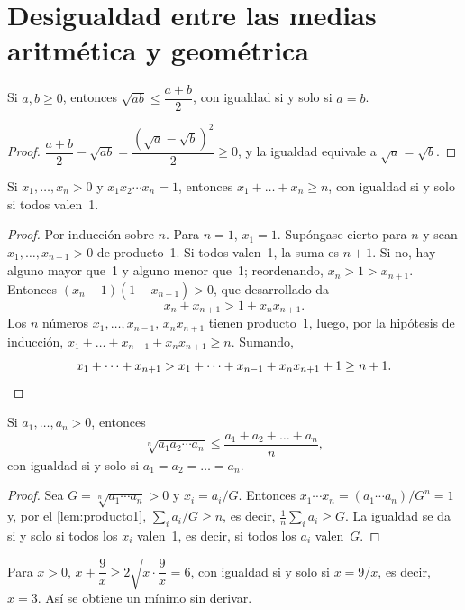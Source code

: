 \section{Desigualdad entre las medias aritmética y geométrica}

\begin{proposicion}\label{prop:amgm2}
Si $a,b\ge0$, entonces $\sqrt{ab}\le\dfrac{a+b}{2}$, con igualdad si y solo si $a=b$.
\end{proposicion}

\begin{proof}
$\dfrac{a+b}{2}-\sqrt{ab}=\dfrac{(\sqrt a-\sqrt b)^2}{2}\ge0$, y la igualdad equivale a $\sqrt a=\sqrt b$.
\end{proof}

\begin{lema}\label{lem:producto1}
Si $x_1,\dots,x_n>0$ y $x_1x_2\cdots x_n=1$, entonces $x_1+\dots+x_n\ge n$, con igualdad si y solo si todos valen~1.
\end{lema}

\begin{proof}
Por inducción sobre $n$. Para $n=1$, $x_1=1$. Supóngase cierto para $n$ y sean $x_1,\dots,x_{n+1}>0$ de producto~1. Si todos valen~1, la suma es $n+1$. Si no, hay alguno mayor que~1 y alguno menor que~1; reordenando, $x_n>1>x_{n+1}$. Entonces $(x_n-1)(1-x_{n+1})>0$, que desarrollado da
\[
x_n+x_{n+1}>1+x_nx_{n+1}.
\]
Los $n$ números $x_1,\dots,x_{n-1},\,x_nx_{n+1}$ tienen producto~1, luego, por la hipótesis de inducción, $x_1+\dots+x_{n-1}+x_nx_{n+1}\ge n$. Sumando,
\[
x_1+\dots+x_{n+1}>x_1+\dots+x_{n-1}+x_nx_{n+1}+1\ge n+1.\qedhere
\]
\end{proof}

\begin{teorema}\label{teo:amgm}
Si $a_1,\dots,a_n>0$, entonces
\[
\sqrt[n]{a_1a_2\cdots a_n}\le\frac{a_1+a_2+\dots+a_n}{n},
\]
con igualdad si y solo si $a_1=a_2=\dots=a_n$.
\end{teorema}

\begin{proof}
Sea $G=\sqrt[n]{a_1\cdots a_n}>0$ y $x_i=a_i/G$. Entonces $x_1\cdots x_n=(a_1\cdots a_n)/G^n=1$ y, por el \cref{lem:producto1}, $\sum_i a_i/G\ge n$, es decir, $\frac1n\sum_ia_i\ge G$. La igualdad se da si y solo si todos los $x_i$ valen~1, es decir, si todos los $a_i$ valen~$G$.
\end{proof}

\begin{ejemplo}\label{ej:amgm-optim}
Para $x>0$, $x+\dfrac 9x\ge 2\sqrt{x\cdot\dfrac9x}=6$, con igualdad si y solo si $x=9/x$, es decir, $x=3$. Así se obtiene un mínimo sin derivar.
\end{ejemplo}

